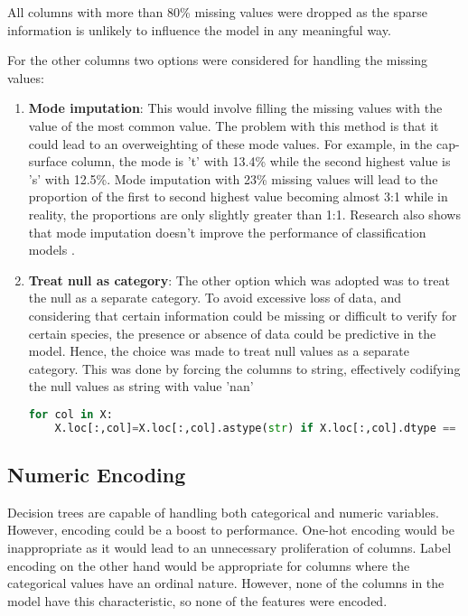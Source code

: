 \documentclass{article}
\begin{document}
All columns with more than 80\% missing values were dropped as the sparse information is unlikely to influence the model in any meaningful way.

For the other columns two options were considered for handling the missing values:
\begin{enumerate}
    \item \textbf{Mode imputation}: This would involve filling the missing values with the value of the most common value. The problem with this method is that it could lead to an overweighting of these mode values. For example, in the cap-surface column, the mode is 't' with 13.4\% while the second highest value is 's' with 12.5\%. Mode imputation with 23\% missing values will lead to the proportion of the first to second highest value becoming almost 3:1 while in reality, the proportions are only slightly greater than 1:1. Research also shows that mode imputation doesn't improve the performance of classification models \cite{modeimputationarticle}.
    \item \textbf{Treat null as category}: The other option which was adopted was to treat the null as a separate category. To avoid excessive loss of data, and considering that certain information could be missing or difficult to verify for certain species, the presence or absence of data could be predictive in the model. Hence, the choice was made to treat null values as a separate category. This was done by forcing the columns to string, effectively codifying the null values as string with value 'nan'

\begin{lstlisting}[language=Python, caption=Forcing categorical variables to string, label=code:missing_values]
    for col in X:
    X.loc[:,col]=X.loc[:,col].astype(str) if X.loc[:,col].dtype == 'object' else X.loc[:,col]
\end{lstlisting}

\end{enumerate}

\subsection{Numeric Encoding}
Decision trees are capable of handling both categorical and numeric variables. However, encoding could be a boost to performance. One-hot encoding would be inappropriate as it would lead to an unnecessary proliferation of columns. Label encoding on the other hand would be appropriate for columns where the categorical values have an ordinal nature. However, none of the columns in the model have this characteristic, so none of the features were encoded.
\end{document}
